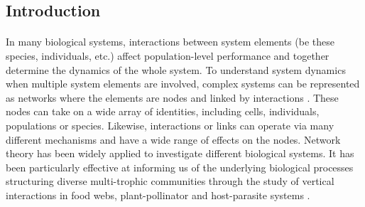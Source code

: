\documentclass[a4,12pt]{article}
\begin{document}
\begin{refsection}

\section{Introduction}

    
    \paragraph{}
    In many biological systems, interactions between system elements (be these species, individuals, etc.) affect population-level performance and together determine the dynamics of the whole system. To understand system dynamics when multiple system elements are involved, complex systems can be represented as networks where the elements are nodes and linked by interactions \parencite{Pimm1978}. These nodes can take on a wide array of identities, including cells, individuals, populations or species. Likewise, interactions or links can operate via many different mechanisms and have a wide range of effects on the nodes. Network theory has been widely applied to investigate different biological systems. It has been particularly effective at informing us of the underlying biological processes structuring diverse multi-trophic communities \parencite{Dunne2002, Thompson2012} through the study of vertical interactions in food webs, plant-pollinator and host-parasite systems \parencite{Lafferty2008, Stouffer2014, Cirtwill2015a}.


\end{refsection}
\end{document}
